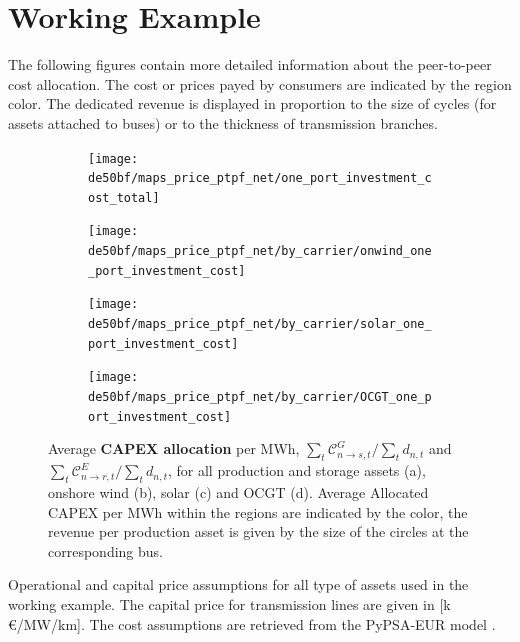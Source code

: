 \documentclass[11pt,twocolumn]{article}
\newcommand{\demand}[1][n]{d_{#1,t}}
\newcommand{\capexgeneration}{\mathcal{C}^G}
\newcommand{\capexstorage}{\mathcal{C}^E}
\newcommand{\allocatecapexgeneration}[1][n \rightarrow s]{\capexgeneration_{#1,t}}
\newcommand{\allocatecapexstorage}[1][n \rightarrow r]{\capexstorage_{#1,t}}
\begin{document}
% 
\section{Working Example}
The following figures contain more detailed information about the peer-to-peer cost allocation. The cost or prices payed by consumers are indicated by the region color. The dedicated revenue is displayed in proportion to the size of cycles (for assets attached to buses) or to the thickness of transmission branches.    
\begin{figure}
    \centering
    \begin{subfigure}[c]{.49\linewidth}
        \texttt{[image: de50bf/maps\_price\_ptpf\_net/one\_port\_investment\_cost\_total]}
        \label{fig:total_capex}
    \end{subfigure}
    \begin{subfigure}[c]{.49\linewidth}
        \texttt{[image: de50bf/maps\_price\_ptpf\_net/by\_carrier/onwind\_one\_port\_investment\_cost]}
        \label{fig:onshore_capex}
    \end{subfigure}
    \begin{subfigure}[c]{.49\linewidth}
        \texttt{[image: de50bf/maps\_price\_ptpf\_net/by\_carrier/solar\_one\_port\_investment\_cost]}
        \label{fig:solar_capex}
    \end{subfigure}
    \begin{subfigure}[c]{.49\linewidth}
        \texttt{[image: de50bf/maps\_price\_ptpf\_net/by\_carrier/OCGT\_one\_port\_investment\_cost]}
        \label{fig:ocgt_capex}
    \end{subfigure}
    \caption{Average \textbf{CAPEX allocation} per MWh, $\sum_t \allocatecapexgeneration / \sum_t \demand$ and $\sum_t \allocatecapexstorage / \sum_t \demand$, for all production and storage assets (a), onshore wind (b), solar (c) and OCGT (d). Average Allocated CAPEX per MWh within the regions are indicated by the color, the revenue per production asset is given by the size of the circles at the corresponding bus.}
    \label{fig:capex_price}
\end{figure}

\begin{table}[h]
    \centering
        
    \caption{Operational and capital price assumptions for all type of assets used in the working example. The capital price for transmission lines are given in [k\,\euro/MW/km]. The cost assumptions are retrieved from the PyPSA-EUR model \cite{horsch_jonas_pypsa-eur_2020}.}
    \label{tab:cost_assumptions}
\end{table} 
\end{document}
